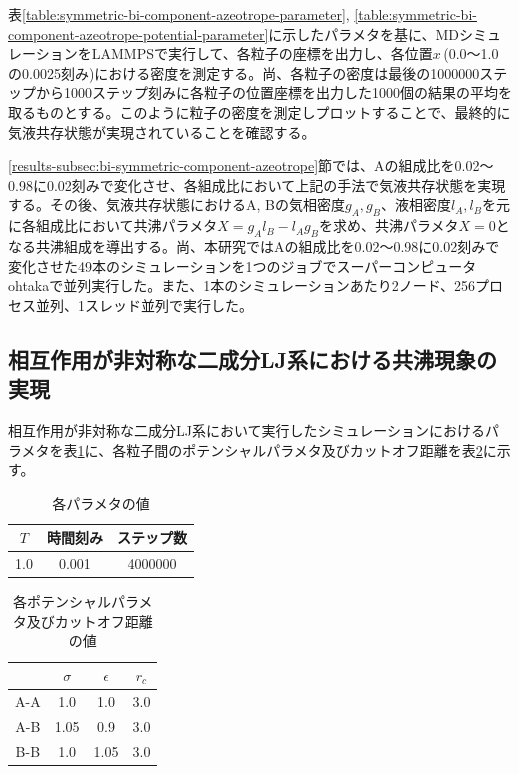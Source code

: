 \documentclass[titlepage]{jsreport}
\begin{document}
表\ref{table:symmetric-bi-component-azeotrope-parameter}, \ref{table:symmetric-bi-component-azeotrope-potential-parameter}に示したパラメタを基に、MDシミュレーションをLAMMPSで実行して、各粒子の座標を出力し、各位置$x$\,(0.0〜1.0の0.0025刻み)における密度を測定する。尚、各粒子の密度は最後の1000000ステップから1000ステップ刻みに各粒子の位置座標を出力した1000個の結果の平均を取るものとする。このように粒子の密度を測定しプロットすることで、最終的に気液共存状態が実現されていることを確認する。

\ref{results-subsec:bi-symmetric-component-azeotrope}節では、Aの組成比を0.02〜0.98に0.02刻みで変化させ、各組成比において上記の手法で気液共存状態を実現する。その後、気液共存状態におけるA, Bの気相密度$g_A, g_B$、液相密度$l_A, l_B$を元に各組成比において共沸パラメタ$X=g_Al_B-l_Ag_B$を求め、共沸パラメタ$X=0$となる共沸組成を導出する。尚、本研究ではAの組成比を0.02〜0.98に0.02刻みで変化させた49本のシミュレーションを1つのジョブでスーパーコンピュータohtakaで並列実行した。また、1本のシミュレーションあたり2ノード、256プロセス並列、1スレッド並列で実行した。


\subsection{相互作用が非対称な二成分LJ系における共沸現象の実現} \label{method-subsec:bi-asymmetric-component-azeotrope}
相互作用が非対称な二成分LJ系において実行したシミュレーションにおけるパラメタを表\ref{table:asymmetric-bi-component-azeotrope-parameter}に、各粒子間のポテンシャルパラメタ及びカットオフ距離を表\ref{table:asymmetric-bi-component-azeotrope-potential-parameter}に示す。

\begin{table}[htbp]
    \begin{center}
        \caption{各パラメタの値}
        \label{table:asymmetric-bi-component-azeotrope-parameter}
            \begin{tabular}{c c c}
                $T$ & 時間刻み & ステップ数 \\
                \hline
                1.0 & 0.001 & 4000000 \\
            \end{tabular}
    \end{center}
\end{table}

\begin{table}[htbp]
    \begin{center}
        \caption{各ポテンシャルパラメタ及びカットオフ距離の値}
        \label{table:asymmetric-bi-component-azeotrope-potential-parameter}
            \begin{tabular}{c | c c c}
                & $\sigma$ & $\epsilon$ & $r_c$ \\
                \hline
                A-A & 1.0 & 1.0 & 3.0 \\
                A-B & 1.05 & 0.9 & 3.0 \\
                B-B & 1.0 & 1.05 & 3.0
            \end{tabular}
    \end{center}
\end{table}
\end{document}
